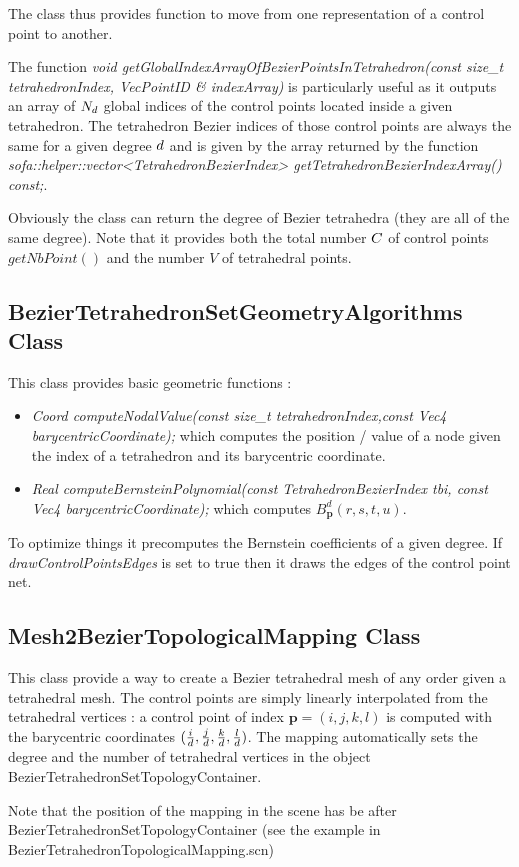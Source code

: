 \documentclass[a4paper,11pt]{article}
\begin{document}
The class thus provides function to move from one representation of a control point to another.

The function {\it void getGlobalIndexArrayOfBezierPointsInTetrahedron(const size\_t tetrahedronIndex, VecPointID \& indexArray) } is particularly useful as it outputs an array of $N_{d}$ global indices of the control points located inside a given tetrahedron. The tetrahedron Bezier indices of those control points are always the same for a given degree ${d}$ and is given by the array returned by the function {\it sofa::helper::vector<TetrahedronBezierIndex> getTetrahedronBezierIndexArray() const;}.

Obviously the class can return the degree of  Bezier tetrahedra (they are all of the same degree). Note that it provides both the total number ${C}$ of control points $getNbPoint()$ and the number $V$ of tetrahedral points.



\subsection{BezierTetrahedronSetGeometryAlgorithms Class}

This class provides basic geometric functions :

\begin{itemize}
	\item {\it Coord computeNodalValue(const size\_t tetrahedronIndex,const Vec4 barycentricCoordinate); } which computes the position / value of a node given the index of a tetrahedron and its barycentric coordinate.
	\item {\it Real computeBernsteinPolynomial(const TetrahedronBezierIndex tbi, const Vec4 barycentricCoordinate);} which computes $B^d_{\mathbf p}(r,s,t,u)$.
\end{itemize}

To optimize things it precomputes the Bernstein coefficients of a given degree. If {\it drawControlPointsEdges} is set to true then it draws the edges of the control point net.  

\subsection{Mesh2BezierTopologicalMapping Class}

This class provide a way to create a Bezier tetrahedral mesh of any order given a tetrahedral mesh. The control points are simply linearly interpolated from the tetrahedral vertices : a control point of index ${\mathbf p}=(i,j,k,l)$ is computed with the barycentric coordinates $(\frac{i}{{d}},\frac{j}{{d}},\frac{k}{{d}},\frac{l}{{d}})$. The mapping automatically sets the degree and the number of tetrahedral vertices in the object BezierTetrahedronSetTopologyContainer.

Note that the position of the mapping in the scene has be after BezierTetrahedronSetTopologyContainer (see the example in BezierTetrahedronTopologicalMapping.scn) 
\end{document}
